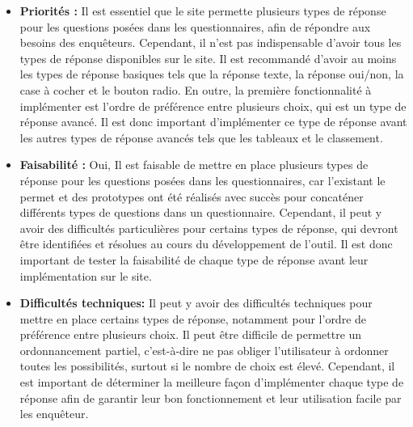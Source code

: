 \documentclass{article}
\begin{document}
\begin{enumerate}[noitemsep]
\begin{itemize}[noitemsep]
    \item \textbf{Priorités : }Il est essentiel que le site permette plusieurs types de réponse pour les questions posées dans les questionnaires, afin de répondre aux besoins des enquêteurs. Cependant, il n'est pas indispensable d'avoir tous les types de réponse disponibles sur le site. Il est recommandé d'avoir au moins les types de réponse basiques tels que la réponse texte, la réponse oui/non, la case à cocher et le bouton radio. En outre, la première fonctionnalité à implémenter est l'ordre de préférence entre plusieurs choix, qui est un type de réponse avancé. Il est donc important d'implémenter ce type de réponse avant les autres types de réponse avancés tels que les tableaux et le classement.
    \item \textbf{Faisabilité : }Oui, Il est faisable de mettre en place plusieurs types de réponse pour les questions posées dans les questionnaires, car l'existant le permet et des prototypes ont été réalisés avec succès pour concaténer différents types de questions dans un questionnaire. Cependant, il peut y avoir des difficultés particulières pour certains types de réponse, qui devront être identifiées et résolues au cours du développement de l'outil. Il est donc important de tester la faisabilité de chaque type de réponse avant leur implémentation sur le site.
    \item \textbf{Difficultés techniques: }Il peut y avoir des difficultés techniques pour mettre en place certains types de réponse, notamment pour l'ordre de préférence entre plusieurs choix. Il peut être difficile de permettre un ordonnancement partiel, c'est-à-dire ne pas obliger l'utilisateur à ordonner toutes les possibilités, surtout si le nombre de choix est élevé. Cependant, il est important de déterminer la meilleure façon d'implémenter chaque type de réponse afin de garantir leur bon fonctionnement et leur utilisation facile par les enquêteur.
\end{itemize}

\newpage


\end{enumerate}
\end{document}

